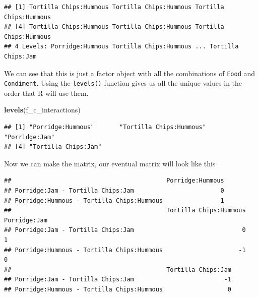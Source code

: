 \documentclass[
]{book}
\newenvironment{Shaded}{\begin{snugshade}}{\end{snugshade}}
\newcommand{\DataTypeTok}[1]{\textcolor[rgb]{0.13,0.29,0.53}{#1}}
\newcommand{\KeywordTok}[1]{\textcolor[rgb]{0.13,0.29,0.53}{\textbf{#1}}}
\newcommand{\NormalTok}[1]{#1}
\newcommand{\OperatorTok}[1]{\textcolor[rgb]{0.81,0.36,0.00}{\textbf{#1}}}
\newcommand{\StringTok}[1]{\textcolor[rgb]{0.31,0.60,0.02}{#1}}
\begin{document}
\begin{Shaded}
\end{Shaded}

\begin{verbatim}
## [1] Tortilla Chips:Hummous Tortilla Chips:Hummous Tortilla Chips:Hummous
## [4] Tortilla Chips:Hummous Tortilla Chips:Hummous Tortilla Chips:Hummous
## 4 Levels: Porridge:Hummous Tortilla Chips:Hummous ... Tortilla Chips:Jam
\end{verbatim}

We can see that this is just a factor object with all the combinations of \texttt{Food} and \texttt{Condiment}. Using the \texttt{levels()} function gives us all the unique values in the order that R will use them.

\begin{Shaded}
\begin{Highlighting}[]
\KeywordTok{levels}\NormalTok{(f_c_interactions)}
\end{Highlighting}
\end{Shaded}

\begin{verbatim}
## [1] "Porridge:Hummous"       "Tortilla Chips:Hummous" "Porridge:Jam"          
## [4] "Tortilla Chips:Jam"
\end{verbatim}

Now we can make the matrix, our eventual matrix will look like this

\begin{verbatim}
##                                           Porridge:Hummous
## Porridge:Jam - Tortilla Chips:Jam                        0
## Porridge:Hummous - Tortilla Chips:Hummous                1
##                                           Tortilla Chips:Hummous Porridge:Jam
## Porridge:Jam - Tortilla Chips:Jam                              0            1
## Porridge:Hummous - Tortilla Chips:Hummous                     -1            0
##                                           Tortilla Chips:Jam
## Porridge:Jam - Tortilla Chips:Jam                         -1
## Porridge:Hummous - Tortilla Chips:Hummous                  0
\end{verbatim}
\end{document}
